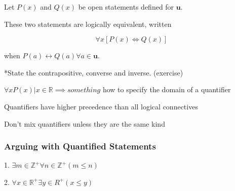\documentclass[12pt]{article}
\begin{document}
Let $P(x)$ and $Q(x)$ be open statements defined for $\mathbf{u}$.

These two statements are logically equivalent, written

\begin{equation*}
  \forall x [P(x) \Leftrightarrow Q(x)]
\end{equation*}

when $P(a) \leftrightarrow Q(a) \forall a \in \mathbf{u}$.

*State the contrapositive, converse and inverse. (exercise)

$\forall x P(x) | x \in \mathbb{R} \implies something$
how to specify the domain of a quantifier

Quantifiers have higher precedence than all logical connectives

Don't mix quantifiers unless they are the same kind

\subsubsection{Arguing with Quantified Statements}

1. $\exists m \in \mathbb{Z}^+ \forall n \in \mathbb{Z}^+ (m \leq n)$

2. $\forall x \in \mathbb{R}^+ \exists y\in{R}^+ (x \leq y)$
\end{document}
